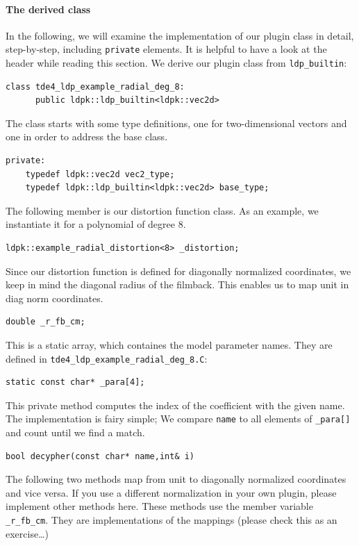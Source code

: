 \documentclass[10pt,a4paper]{article}
\begin{document}
\paragraph{The derived class}
In the following, we will examine the implementation of our plugin class
in detail, step-by-step, including {\tt private} elements.
It is helpful to have a look at the header while reading this section.
We derive our plugin class from {\tt ldp\_builtin}:
\begin{lstlisting}[language=mycpp,tabsize=8]
class tde4_ldp_example_radial_deg_8:
      public ldpk::ldp_builtin<ldpk::vec2d>
\end{lstlisting}
The class starts with some type definitions, one for two-dimensional vectors
and one in order to address the base class.
\begin{lstlisting}[language=mycpp,tabsize=8]
private:
	typedef ldpk::vec2d vec2_type;
	typedef ldpk::ldp_builtin<ldpk::vec2d> base_type;
\end{lstlisting}
The following member is our distortion function class.
As an example, we instantiate it for a polynomial of degree 8.
\begin{lstlisting}[language=mycpp,tabsize=8]
	ldpk::example_radial_distortion<8> _distortion;
\end{lstlisting}
Since our distortion function is defined for diagonally normalized
coordinates, we keep in mind the diagonal radius of the filmback.
This enables us to map unit in diag norm coordinates.
\begin{lstlisting}[language=mycpp,tabsize=8]
	double _r_fb_cm;
\end{lstlisting}
This is a static array, which containes the model parameter names.
They are defined in {\tt tde4\_ldp\_example\_radial\_deg\_8.C}:
\begin{lstlisting}[language=mycpp,tabsize=8]
	static const char* _para[4];
\end{lstlisting}
This private method computes the index of the coefficient
with the given name. The implementation is fairy simple;
We compare {\tt name} to all elements of {\tt\_para[]} and count
until we find a match.
\begin{lstlisting}[language=mycpp,tabsize=8]
	bool decypher(const char* name,int& i)
\end{lstlisting}
The following two methods map from unit to diagonally normalized coordinates
and vice versa. If you use a different normalization in your own plugin,
please implement other methods here. These methods use the member variable
{\tt\_r\_fb\_cm}. They are implementations of the mappings (please check this as an exercise\ldots)
\end{document}
